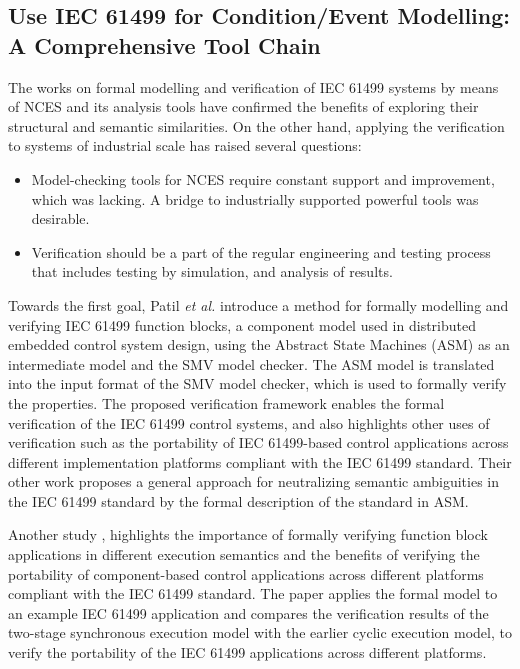 \begin{bibunit}
\section{Use IEC 61499 for Condition/Event Modelling: A Comprehensive Tool Chain} \label{sec:framework}

The works on formal modelling and verification of IEC 61499 systems by means of NCES and its analysis tools have confirmed the benefits of exploring their structural and semantic similarities. On the other hand, applying the verification to systems of industrial scale has raised several questions:
\begin{itemize}
\item Model-checking tools for NCES require constant support and improvement, which was lacking. A bridge to industrially supported powerful tools was desirable.
\item Verification should be a part of the regular engineering and testing process that includes testing by simulation, and analysis of results. 
\end{itemize}
 
 Towards the first goal, Patil \textit{et al.} \cite{patil2015formal} introduce a method for formally modelling and verifying IEC 61499 function blocks, a component model used in distributed embedded control system design, using the Abstract State Machines (ASM) as an intermediate model and the SMV model checker. The ASM model is translated into the input format of the SMV model checker, which is used to formally verify the properties. The proposed verification framework enables the formal verification of the IEC 61499 control systems, and also highlights other uses of verification such as the portability of IEC 61499-based control applications across different implementation platforms compliant with the IEC 61499 standard. Their other work \cite{patil2015neutralizing} proposes a general approach for neutralizing semantic ambiguities in the IEC 61499 standard by the formal description of the standard in ASM.

Another study \cite{patil2015formal}, highlights the importance of formally verifying function block applications in different execution semantics and the benefits of verifying the portability of component-based control applications across different platforms compliant with the IEC 61499 standard. The paper applies the formal model to an example IEC 61499 application and compares the verification results of the two-stage synchronous execution model with the earlier cyclic execution model, to verify the portability of the IEC 61499 applications across different platforms.


\end{bibunit}

